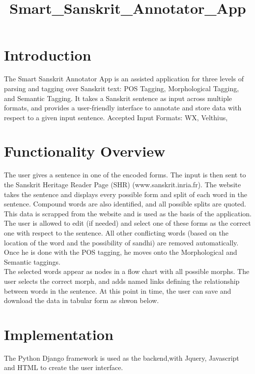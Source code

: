 \documentclass[12pt]{article}
\title{Smart_Sanskrit\_Annotator\_App}
\begin{document}
\section{Introduction}
The Smart Sanskrit Annotator App is an assisted application for three levels of parsing and tagging over Sanskrit text: POS Tagging, Morphological Tagging, and Semantic Tagging. It takes a Sanskrit sentence as input across multiple formats, and provides a user-friendly interface to annotate and store data with respect to a given input sentence.
Accepted Input Formats: WX, Velthius,

\section{Functionality Overview}
The user gives a sentence in one of the encoded forms. The input is then sent to the Sanskrit Heritage Reader Page (SHR) (www.sanskrit.inria.fr). The website takes the sentence and displays every possible form  and split of each word in the sentence. Compound words are also identified, and all possible splits are quoted. This data is scrapped from the website and is used as the basis of the application. 
\\The user is allowed to edit (if needed) and select one of these forms as the correct one with respect to the sentence. All other conflicting words (based on the location of the word and the possibility of sandhi) are removed automatically. Once he is done with the POS tagging, he moves onto the Morphological and Semantic taggings.
\\The selected words appear as nodes in a flow chart with all possible morphs. The user selects the correct morph, and adds named links defining the relationship between words in the sentence. At this point in time, the user can save and download the data in tabular form as shwon below. 

\section{Implementation}
The Python Django framework is used as the backend,with Jquery, Javascript and HTML to create the user interface. 
\end{document}
